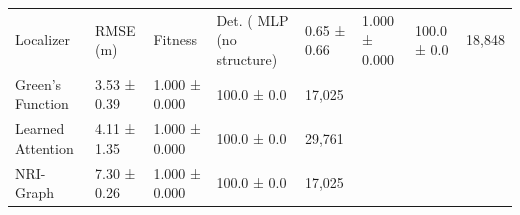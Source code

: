 \begin{tabular}{lllll}
\toprule
Localizer & RMSE (m) & Fitness & Det. (%
\midrule
MLP (no structure) & 0.65 ± 0.66 & 1.000 ± 0.000 & 100.0 ± 0.0 & 18,848 \\
Green's Function & 3.53 ± 0.39 & 1.000 ± 0.000 & 100.0 ± 0.0 & 17,025 \\
Learned Attention & 4.11 ± 1.35 & 1.000 ± 0.000 & 100.0 ± 0.0 & 29,761 \\
NRI-Graph & 7.30 ± 0.26 & 1.000 ± 0.000 & 100.0 ± 0.0 & 17,025 \\
\bottomrule
\end{tabular}
